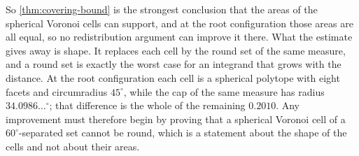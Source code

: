 \documentclass[11pt,reqno]{amsart}
\renewcommand{\_}{\origunderscore\allowbreak}
\numberwithin{equation}{section}
\theoremstyle{plain}
\theoremstyle{definition}
\theoremstyle{remark}
\begin{document}
So \cref{thm:covering-bound} is the strongest conclusion that the areas
of the spherical Voronoi cells can support, and at the root configuration those areas are all equal, so
no redistribution argument can improve it there. What the estimate gives
away is shape. It replaces each cell by the round set of the same
measure, and a round set is exactly the worst case for an integrand that
grows with the distance. At the root configuration each cell is a
spherical polytope with eight facets and circumradius $45^\circ$, while
the cap of the same measure has radius $34.0986\ldots^\circ$; that
difference is the whole of the remaining $0.2010$. Any improvement must
therefore begin by proving that a spherical Voronoi cell of a
$60^\circ$-separated set cannot be round, which is a statement about the
shape of the cells and not about their areas.
\end{document}
